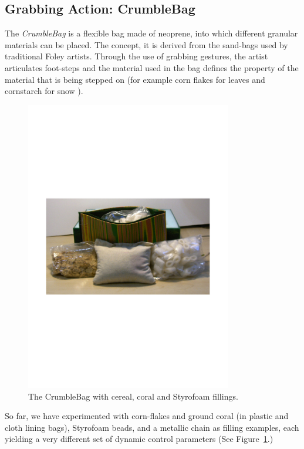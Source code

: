 \subsection{Grabbing Action: CrumbleBag}

The {\em CrumbleBag} is a flexible bag made of neoprene, into which different granular materials can be placed. The concept, it is derived from the
sand-bags used by traditional Foley artists. Through the use of grabbing gestures, the
artist articulates foot-steps and the material used in the bag defines
the property of the material that is being stepped on (for example
corn flakes for leaves and cornstarch for snow \cite{Ebersole:2003}).

\begin{figure}[t]
\centering
\includegraphics[width=90mm]{CrumbleBags-eps-converted-to.pdf}
\caption{The CrumbleBag with cereal, coral and Styrofoam fillings.}
\label{Omodhrain:fig:crumblebag}
\end{figure}

So far, we have experimented with corn-flakes and ground coral (in plastic and cloth lining bags), Styrofoam beads, and a metallic chain as filling examples, each yielding a very different set of dynamic control parameters (See Figure~\ref{Omodhrain:fig:crumblebag}.)


